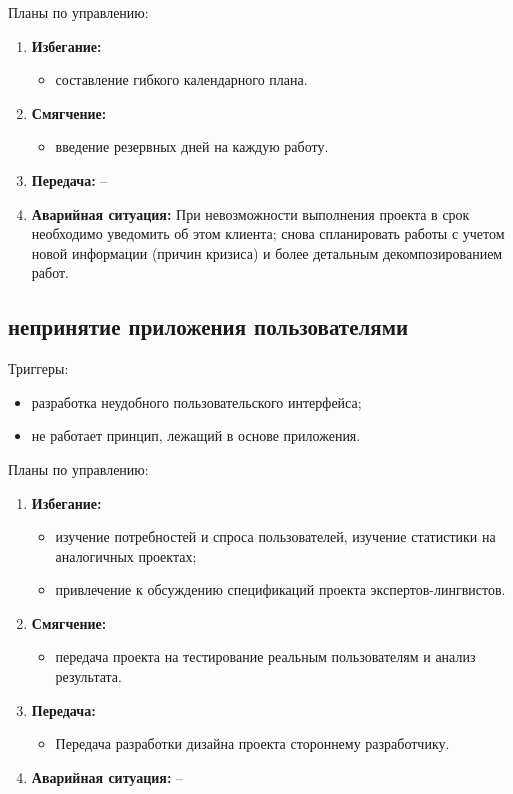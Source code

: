 \documentclass[a4paper,14pt]{extarticle}
\begin{document}
Планы по управлению:
\begin{enumerate}
    \item \textbf{Избегание:}
    \begin{itemize}
        \item составление гибкого календарного плана.
    \end{itemize}

    \item \textbf{Смягчение:}
    \begin{itemize}
        \item введение резервных дней на каждую работу.
    \end{itemize}

    \item \textbf{Передача:} --

    \item \textbf{Аварийная ситуация:} При невозможности выполнения проекта в
          срок необходимо уведомить об этом клиента; снова спланировать работы с
          учетом новой информации (причин кризиса) и более детальным
          декомпозированием работ.
\end{enumerate}

\subsection{непринятие приложения пользователями}
Триггеры:
\begin{itemize}
    \item разработка неудобного пользовательского интерфейса;
    \item не работает принцип, лежащий в основе приложения.
\end{itemize}

Планы по управлению:
\begin{enumerate}
    \item \textbf{Избегание:}
    \begin{itemize}
        \item изучение потребностей и спроса пользователей, изучение статистики на аналогичных проектах;
        \item привлечение к обсуждению спецификаций проекта экспертов-лингвистов.
    \end{itemize}

    \item \textbf{Смягчение:}
    \begin{itemize}
        \item передача проекта на тестирование реальным пользователям и анализ результата.
    \end{itemize}

    \item \textbf{Передача:}
    \begin{itemize}
        \item Передача разработки дизайна проекта стороннему разработчику.
    \end{itemize}

    \item \textbf{Аварийная ситуация:} --
\end{enumerate}
\end{document}

